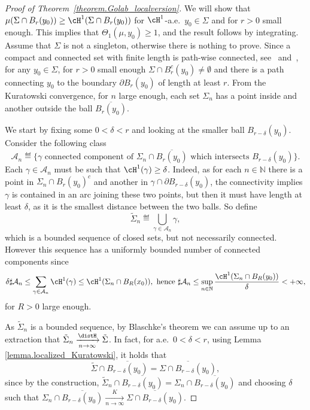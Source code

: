 \begin{proof}[Proof of Theorem~\ref{theorem.Golab_localversion}]
We will show that $\mu(\Sigma \cap B_r(y_0)) \ge \cH^1(\Sigma \cap B_r(y_0))$ for $\cH^1$\nobreakdash-a.e.\ $y_0\in \Sigma$ and for $r>0$ small enough. This implies that $\Theta_1(\mu, y_0) \ge 1$, and the result follows by integrating. Assume that $\Sigma$ is not a singleton, otherwise there is nothing to prove. Since a compact and connected set with finite length is path-wise connected, see~\cite[Prop.\,30.1 \& Cor.\,30.2]{david2006singular} and~\cite[Th.\,4.4]{alberti2017structure}, for any $y_0 \in \Sigma$, for $r>0$ small enough $\Sigma \cap B_r^c(y_0) \neq \emptyset$ and there is a path connecting $y_0$ to the boundary $\partial B_r(y_0)$ of length at least $r$. From the Kuratowski convergence, for $n$ large enough, each set $\Sigma_n$ has a point inside and another outside the ball $\overline{B_r(y_0)}$.

We start by fixing some $0< \delta < r$ and looking at the smaller ball $B_{r-\delta}(y_0)$. Consider the following class
\[
\mathcal{A}_n
\eqdef
\bigl\{
\gamma \text{ connected component of $\Sigma_n\cap \overline{B_r(y_0)}$ which intersects $B_{r-\delta}(y_0)$}
\bigr\}.
\]
Each $\gamma \in \mathcal{A}_n$ must be such that $\cH^1(\gamma) \ge \delta$. Indeed, as for each $n \in \mathbb{N}$ there is a point in $\Sigma_n\cap B_r(y_0)^c$ and another in $\gamma \cap \partial B_{r-\delta}(y_0)$, the connectivity implies $\gamma$ is contained in an arc joining these two points, but then it must have length at least $\delta$, as it is the smallest distance between the two balls. So define
\[
\tilde\Sigma_n \eqdef
\bigcup_{\gamma \in \mathcal{A}_n}
\gamma,
\]
which is a bounded sequence of closed sets, but not necessarily connected. However this sequence has a uniformly bounded number of connected components since
\[
\delta\sharp \mathcal{A}_n
\le
\sum_{\gamma \in \mathcal{A}_n} \cH^1(\gamma)
\le \cH^1(\Sigma_n \cap B_R(x_0)), \text{ hence }
\sharp \mathcal{A}_n
\le \sup_{n \in \mathbb{N}} \frac{\cH^1(\Sigma_n\cap B_R(y_0))}{\delta}
< +\infty,
\]
for $R>0$ large enough.

As $\tilde \Sigma_n$ is a bounded sequence, by Blaschke's theorem we can assume up to an extraction that $\tilde \Sigma_n \xrightarrow[n \to \infty]{\distH} \tilde \Sigma$. In fact, for a.e.\ $0 < \delta < r$, using Lemma \ref{lemma.localized_Kuratowski}, it holds that
\begin{equation}\label{identity}
\tilde \Sigma\cap \overline{B_{r-\delta}(y_0)} = \overline{\Sigma\cap B_{r-\delta}(y_0)},
\end{equation}
since by the construction, $\tilde \Sigma_n\cap \overline{B_{r-\delta}(y_0)} = \Sigma_n\cap \overline{B_{r-\delta}(y_0)}$ and choosing $\delta$ such that $\Sigma_n\cap \overline{B_{r-\delta}(y_0)} \xrightarrow[n \to \infty]{K} \overline{\Sigma\cap B_{r-\delta}(y_0)}$.


\end{proof}
